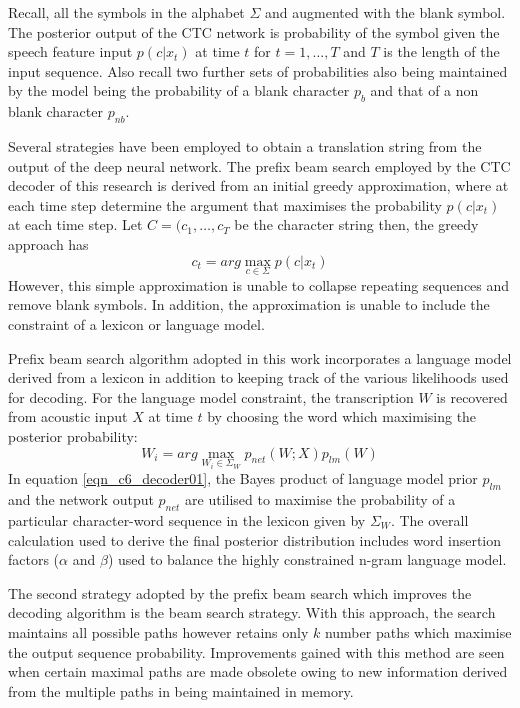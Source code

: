 Recall, all the symbols in the alphabet $\Sigma$ and augmented with the blank symbol. The posterior output of the CTC network is probability of the symbol given the speech feature input $p(c|x_t)$ at time $t$ for $t=1,\dots,T$ and $T$ is the length of the input sequence.  Also recall two further sets of probabilities also being maintained by the model being the probability of a blank character $p_b$ and that of a non blank character $p_{nb}$.

Several strategies have been employed to obtain a translation string from the output of the deep neural network.  The prefix beam search employed by the CTC decoder of this research is derived from an initial greedy approximation, where at each time step determine the argument that maximises the  probability $p(c|x_t)$ at each time step. Let $C=(c_1,\dots,c_T$ be the character string then, the greedy approach has 
\begin{equation}
    c_t=arg\max_{c\in\Sigma}p(c|x_t)
\end{equation}
However, this simple approximation is unable to collapse repeating sequences and remove blank symbols. In addition, the approximation is unable to include the constraint of a lexicon or language model.

Prefix beam search algorithm \cite{hannun2014first} adopted in this work incorporates a language model derived from a lexicon in addition to keeping track of the various likelihoods used for decoding.  For the language model constraint, the transcription $W$ is recovered from acoustic input $X$ at time $t$ by choosing the word which maximising the posterior probability:
\begin{equation}
W_i=arg\max_{W_i \in \Sigma_W} p_{net}(W;X)p_{lm}(W)
\label{eqn_c6_decoder01}
\end{equation}
In equation \ref{eqn_c6_decoder01}, the Bayes product of language model prior $p_{lm}$ and the network output $p_{net}$ are utilised to maximise the probability of a particular character-word sequence in the lexicon given by $\Sigma_W$.  The overall calculation used to derive the final posterior distribution includes word insertion factors ($\alpha$ and $\beta$) used to balance the highly constrained n-gram language model.

The second strategy adopted by the prefix beam search which improves the decoding algorithm is the beam search strategy.  With this approach, the search maintains all possible paths however retains only $k$ number paths which maximise the output sequence probability.  Improvements gained with this method are seen when certain maximal paths are made obsolete owing to new information derived from the multiple paths in being maintained in memory. 


